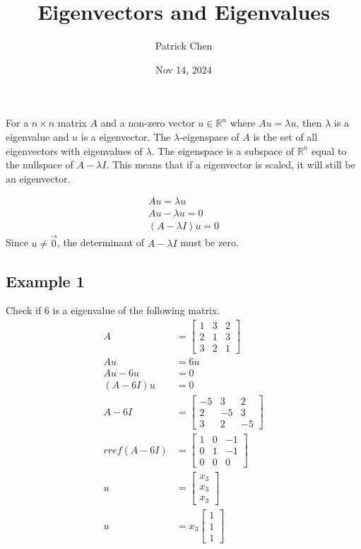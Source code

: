 \documentclass{article}
\title{Eigenvectors and Eigenvalues}
\author{Patrick Chen}
\date{Nov 14, 2024}
\theoremstyle{mytheoremstyle}
\theoremstyle{mytheoremstyle}
\theoremstyle{myproblemstyle}
\begin{document}
    \maketitle
    For a $n\times n$ matrix $A$ and a non-zero vector $u\in \mathbb{R}^n$ where
    $Au=\lambda u$, then $\lambda$ is a eigenvalue and $u$ is a eigenvector. The
    $\lambda$-eigenspace of $A$ is the set of all eigenvectors with eigenvalues
    of $\lambda$. The eigenspace is a subspace of $\mathbb{R}^n$ equal to the
    nullspace of $A-\lambda I$. This means that if a eigenvector is scaled, it
    will still be an eigenvector.

    \begin{align*}
        Au = \lambda u \\
        Au - \lambda u = 0 \\
        (A-\lambda I)u = 0
    \end{align*}
    Since $u\ne \vec{0}$, the determinant of $A-\lambda I$ must be zero.

    \subsection*{Example 1}
    Check if $6$ is a eigenvalue of the following matrix.
    \begin{align*}
        A &= \begin{bmatrix}
            1 & 3 & 2 \\
            2 & 1 & 3 \\
            3 & 2 & 1
        \end{bmatrix} \\
        Au &= 6u \\
        Au-6u &= 0 \\
        (A-6I)u &= 0 \\
        A-6I &= \begin{bmatrix}
            -5 & 3 & 2 \\
            2 & -5 & 3 \\
            3 & 2 & -5
        \end{bmatrix} \\
        rref(A-6I) &= \begin{bmatrix}
            1 & 0 & -1 \\
            0 & 1 & -1 \\
            0 & 0 & 0
        \end{bmatrix} \\
        u &= \begin{bmatrix}
            x_3 \\ x_3 \\ x_3
        \end{bmatrix} \\
        u &= x_3 \begin{bmatrix}
            1 \\ 1 \\ 1
        \end{bmatrix}
    \end{align*}
\end{document}
